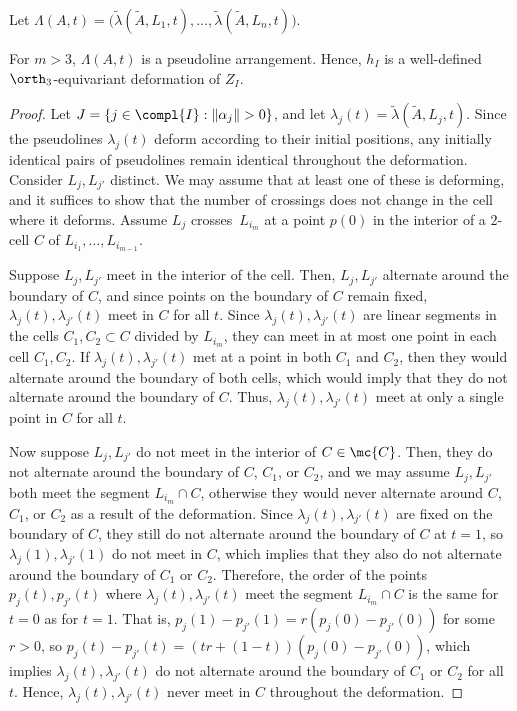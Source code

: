 Let $\Lambda(A,t) = \bigl(\tilde \lambda(\tilde A,L_1,t),\dots,\tilde \lambda(\tilde A,L_n,t)\bigr)$.

\begin{claim}\label{claim-lambda-arrangement}
For $m>3$, $\Lambda(A,t)$ is a pseudoline arrangement. Hence, $h_I$ is a well-defined $\orth_3$-equivariant deformation of $Z_I$.
\end{claim}

\newcommand{\xj}{{j'}}

\begin{proof}
Let $J = \{ j \in \compl{I}: \|\alpha_j\| > 0 \}$, and let $\lambda_j(t) = \tilde\lambda(\tilde A, L_j,t)$.
Since the pseudolines $\lambda_j(t)$ deform according to their initial positions, any initially identical pairs of pseudolines remain identical throughout the deformation. Consider $L_j,L_\xj$ distinct. We may assume that at least one of these is deforming, and it suffices to show that the number of crossings does not change in the cell where it deforms.
Assume $L_j$ crosses~$L_{i_m}$ at a point $p(0)$ in the interior of a $2$-cell $C$ of $L_{i_1},\dots,L_{i_{m-1}}$.

Suppose $L_j,L_\xj$ meet in the interior of the cell. Then, $L_j,L_\xj$ alternate around the boundary of $C$, and since points on the boundary of $C$ remain fixed, $\lambda_j(t),\lambda_\xj(t)$ meet in $C$ for all $t$. Since $\lambda_j(t),\lambda_\xj(t)$ are linear segments in the cells $C_1,C_2 \subset C$ divided by $L_{i_m}$, they can meet in at most one point in each cell $C_1,C_2$. If $\lambda_j(t),\lambda_\xj(t)$ met at a point in both $C_1$ and $C_2$, then they would alternate around the boundary of both cells, which would imply that they do not alternate around the boundary of $C$.
Thus, $\lambda_j(t),\lambda_\xj(t)$ meet at only a single point in $C$ for all $t$.

Now suppose $L_j,L_\xj$ do not meet in the interior of $C \in \mc{C}$.
Then, they do not alternate around the boundary of $C$, $C_1$, or $C_2$,
and we may assume $L_j,L_\xj$ both meet the segment $L_{i_m} \cap C$, otherwise they would never alternate around $C$, $C_1$, or $C_2$ as a result of the deformation.
Since $\lambda_j(t),\lambda_\xj(t)$ are fixed on the boundary of $C$, they still do not alternate around the boundary of $C$ at $t=1$, so $\lambda_j(1),\lambda_\xj(1)$ do not meet in $C$, which implies that they also do not alternate around the boundary of $C_1$ or $C_2$.
Therefore, the order of the points $p_j(t),p_{\xj}(t)$ where $\lambda_j(t),\lambda_\xj(t)$ meet the segment $L_{i_m} \cap C$ is the same for $t=0$ as for $t=1$.
That is, $p_{j}(1)-p_{\xj}(1)= r (p_{j}(0)-p_{\xj}(0))$ for some $r >0$, so
$p_{j}(t)-p_{\xj}(t)= (tr +(1-t)) (p_{j}(0)-p_{\xj}(0))$, which implies $\lambda_j(t),\lambda_\xj(t)$ do not alternate around the boundary of $C_1$ or $C_2$ for all $t$. Hence, $\lambda_j(t),\lambda_\xj(t)$ never meet in $C$ throughout the deformation.


\end{proof}
